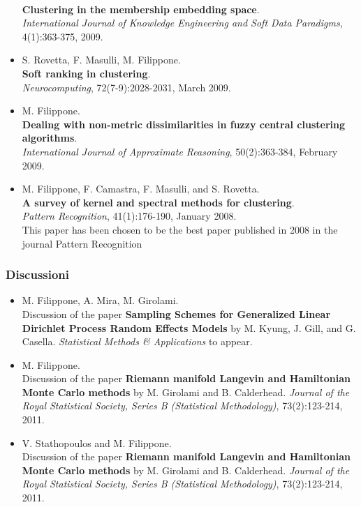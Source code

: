 \documentclass[a4paper,10pt]{article}
\begin{document}
\begin{itemize}
       \\\textbf{Clustering in the membership embedding space}.
       \\\emph{International Journal of Knowledge Engineering and Soft Data Paradigms}, 4(1):363-375, 2009.
     \item  S. Rovetta, F. Masulli, M. Filippone.
       \\\textbf{Soft ranking in clustering}.
       \\\emph{Neurocomputing}, 72(7-9):2028-2031, March 2009.
     \item  M. Filippone.
       \\\textbf{Dealing with non-metric dissimilarities in fuzzy central clustering algorithms}.
       \\\emph{International Journal of Approximate Reasoning}, 50(2):363-384, February 2009.
     \item  M. Filippone, F. Camastra, F. Masulli, and S. Rovetta.
       \\\textbf{A survey of kernel and spectral methods for clustering}.
       \\\emph{Pattern Recognition}, 41(1):176-190, January 2008.
       \\{\footnotesize This paper has been chosen to be the best paper published in 2008 in the journal Pattern Recognition}
\end{itemize}

\subsubsection*{Discussioni}
\begin{itemize}
     \item M. Filippone, A. Mira, M. Girolami.
       \\Discussion of the paper \textbf{Sampling Schemes for Generalized Linear Dirichlet Process Random Effects Models} by M. Kyung, J. Gill, and G. Casella.
       \emph{Statistical Methods \& Applications} to appear.
     \item M. Filippone.
       \\Discussion of the paper \textbf{Riemann manifold Langevin and Hamiltonian Monte Carlo methods} by M. Girolami and B. Calderhead. 
       \emph{Journal of the Royal Statistical Society, Series B (Statistical Methodology)}, 73(2):123-214, 2011.
     \item V. Stathopoulos and M. Filippone.
       \\Discussion of the paper \textbf{Riemann manifold Langevin and Hamiltonian Monte Carlo methods} by M. Girolami and B. Calderhead. 
       \emph{Journal of the Royal Statistical Society, Series B (Statistical Methodology)}, 73(2):123-214, 2011.
\end{itemize}
\end{document}
